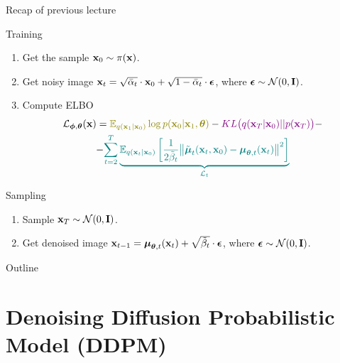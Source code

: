 \begin{frame}{Recap of previous lecture}
	\begin{block}{Training}
		\begin{enumerate}
			\item Get the sample $\mathbf{x}_0 \sim \pi(\mathbf{x})$.
			\item Get noisy image $\mathbf{x}_t = \sqrt{\bar{\alpha}_t} \cdot \mathbf{x}_0 + \sqrt{1 - \bar{\alpha}_t} \cdot \boldsymbol{\epsilon}$, where $\boldsymbol{\epsilon} \sim \mathcal{N}(0, \mathbf{I})$.
			\item Compute ELBO 
			\vspace{-0.3cm}
			\begin{multline*}
				\cL_{\bphi, \btheta}(\bx) =  {\color{olive}\bbE_{q(\bx_1 | \bx_0)} \log p(\bx_0 | \bx_1, \btheta)} - {\color{violet}KL\bigl(q(\bx_T | \bx_0) || p(\bx_T)\bigr)} - \\
				- {\color{teal}\sum_{t=2}^T \underbrace{ \bbE_{q(\bx_t | \bx_0)} \left[\frac{1}{2\tilde{\beta}_t} \bigl\| \tilde{\bmu}_t(\bx_t, \bx_0) - \bmu_{\btheta, t}(\bx_t) \bigr\|^2  \right]}_{\cL_t}}
			\end{multline*}
			\vspace{-0.7cm}
		\end{enumerate}
	\end{block}
	\begin{block}{Sampling}
		\begin{enumerate}
			\item Sample $\mathbf{x}_T \sim \mathcal{N}(0, \mathbf{I})$.
			\item Get denoised image $\mathbf{x}_{t - 1} = \boldsymbol{\mu}_{\boldsymbol{\theta}, t}(\mathbf{x}_t) +  \sqrt{\tilde{\beta}_t} \cdot \boldsymbol{\epsilon}$, where $\boldsymbol{\epsilon} \sim \mathcal{N}(0, \mathbf{I})$.
		\end{enumerate}
	\end{block}
	
\end{frame}
\begin{frame}{Outline}
	\tableofcontents
\end{frame}
\section{Denoising Diffusion Probabilistic Model (DDPM)}
